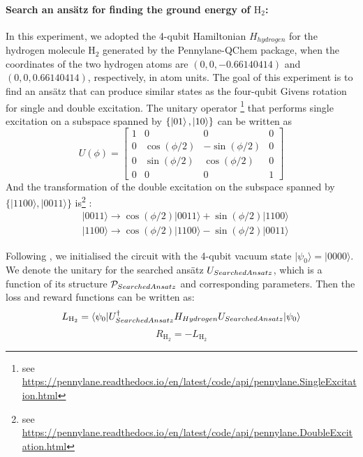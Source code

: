 \documentclass{ieeeaccess}
\begin{document}
\paragraph{Search an ans\"atz for finding the ground energy of $\text{H}_2$:}
In this experiment, we adopted the 4-qubit Hamiltonian $H_{hydrogen}$ for the hydrogen molecule $\text{H}_2$ generated by the Pennylane-QChem \cite{bergholm2020pennylane} package, when the coordinates of the two hydrogen atoms are $(0, 0, -0.66140414)$ and $(0, 0, 0.66140414)$, respectively, in atom units. The goal of this experiment is to find an ans\"atz that can produce similar states as the four-qubit Givens rotation for single and double excitation.
The unitary operator \footnote{see \url{https://pennylane.readthedocs.io/en/latest/code/api/pennylane.SingleExcitation.html}} that performs single excitation on a subspace spanned by $\{\ket{01}, \ket{10} \}$ can be written as 
\begin{equation}
U(\phi)=\left[\begin{array}{cccc}
1 & 0 & 0 & 0 \\
0 & \cos (\phi / 2) & -\sin (\phi / 2) & 0 \\
0 & \sin (\phi / 2) & \cos (\phi / 2) & 0 \\
0 & 0 & 0 & 1
\end{array}\right]
\end{equation}
And the transformation of the double excitation on the subspace spanned by $\{|1100\rangle,|0011\rangle\}$ is\footnote{see \url{https://pennylane.readthedocs.io/en/latest/code/api/pennylane.DoubleExcitation.html}} :
\begin{equation}
\begin{aligned}
&|0011\rangle \rightarrow \cos (\phi / 2)|0011\rangle+\sin (\phi / 2)|1100\rangle \\
&|1100\rangle \rightarrow \cos (\phi / 2)|1100\rangle-\sin (\phi / 2)|0011\rangle
\end{aligned}
\end{equation}

Following \cite{pennylane_dev_team_2021}, we initialised the circuit with the 4-qubit vacuum state $\vert \psi_0\rangle=\vert 0000\rangle$. We denote the unitary for the searched ans\"atz $U_{\rm SearchedAnsatz}$, which is a function of its structure $\mathcal{P}_{\rm SearchedAnsatz}$ and corresponding parameters. Then the loss and reward functions can be written as:
\begin{equation}
    L_{\text{H}_2} =\langle \psi_0 \vert U_{\rm SearchedAnsatz}^{\dagger} H_{\rm Hydrogen} U_{\rm SearchedAnsatz} \vert \psi_0\rangle
\end{equation}
\begin{equation}
    R_{\text{H}_2} = -L_{\text{H}_2}
\end{equation}
\end{document}
